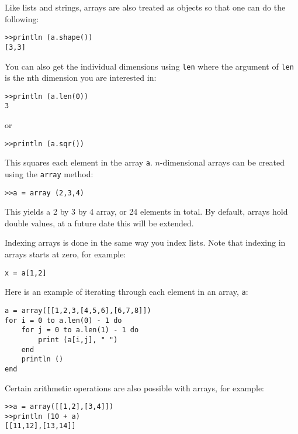 Like lists and strings, arrays are also treated as objects so that one can do the following:

\begin{lstlisting}
>>println (a.shape())
[3,3]
\end{lstlisting}

You can also get the individual dimensions using {\tt len} where the argument of {\tt len} is the nth dimension you are interested in:

\begin{lstlisting}
>>println (a.len(0))
3
\end{lstlisting}

or

\begin{lstlisting}
>>println (a.sqr())
\end{lstlisting}

This squares each element in the array {\tt a}. $n$-dimensional arrays can be created using the {\tt array} method:

\begin{lstlisting}
>>a = array (2,3,4)
\end{lstlisting}

This yields a 2 by 3 by 4 array, or 24 elements in total. By default, arrays hold double values, at a future date this will be extended.


Indexing arrays is done in the same way you index lists. Note that indexing in arrays starts at zero, for example:

\begin{lstlisting}
x = a[1,2]
\end{lstlisting}

Here is an example of iterating through each element in an array, {\tt a}:

\begin{lstlisting}
a = array([[1,2,3,[4,5,6],[6,7,8]])
for i = 0 to a.len(0) - 1 do
    for j = 0 to a.len(1) - 1 do
        print (a[i,j], " ")
    end
    println ()
end
\end{lstlisting}

Certain arithmetic operations are also possible with arrays, for example:

\begin{lstlisting}
>>a = array([[1,2],[3,4]])
>>println (10 + a)
[[11,12],[13,14]]
\end{lstlisting}

